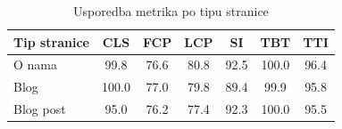 \begin{table}[H]
    \centering
    \caption{Usporedba metrika po tipu stranice}
    \label{tab:usporedba_metrika_po_tipu_stranice}
    \begin{tabular}{|l|c|c|c|c|c|c|}
        \hline
        \textbf{Tip stranice} & \textbf{CLS} & \textbf{FCP} & \textbf{LCP} & \textbf{SI} & \textbf{TBT} & \textbf{TTI} \\
        \hline
        O nama                & 99.8         & 76.6         & 80.8         & 92.5        & 100.0        & 96.4         \\
        \hline
        Blog                  & 100.0        & 77.0         & 79.8         & 89.4        & 99.9         & 95.8         \\
        \hline
        Blog post             & 95.0         & 76.2         & 77.4         & 92.3        & 100.0        & 95.5         \\
        \hline
    \end{tabular}
\end{table}

